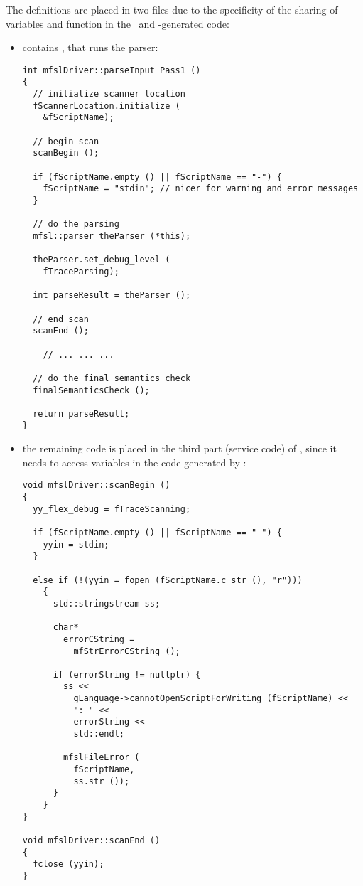 The definitions are placed in two files due to the specificity of the sharing of variables and function in the \flex\ and \bison-generated code: %
\begin{itemize}

\item {} contains , that runs the parser:
\begin{lstlisting}[language=CPlusPlus]
int mfslDriver::parseInput_Pass1 ()
{
  // initialize scanner location
  fScannerLocation.initialize (
    &fScriptName);

  // begin scan
  scanBegin ();

  if (fScriptName.empty () || fScriptName == "-") {
    fScriptName = "stdin"; // nicer for warning and error messages
  }

  // do the parsing
  mfsl::parser theParser (*this);

  theParser.set_debug_level (
    fTraceParsing);

  int parseResult = theParser ();

  // end scan
  scanEnd ();

	// ... ... ...

  // do the final semantics check
  finalSemanticsCheck ();

  return parseResult;
}
\end{lstlisting}

\item the remaining code is placed in the third part (service code) of , since it needs to access variables in the code generated by \flex:
\begin{lstlisting}[language=CPlusPlus]
void mfslDriver::scanBegin ()
{
  yy_flex_debug = fTraceScanning;

  if (fScriptName.empty () || fScriptName == "-") {
    yyin = stdin;
  }

  else if (!(yyin = fopen (fScriptName.c_str (), "r")))
    {
      std::stringstream ss;

      char*
        errorCString =
          mfStrErrorCString ();

      if (errorString != nullptr) {
        ss <<
          gLanguage->cannotOpenScriptForWriting (fScriptName) <<
          ": " <<
          errorString <<
          std::endl;

        mfslFileError (
          fScriptName,
          ss.str ());
      }
    }
}

void mfslDriver::scanEnd ()
{
  fclose (yyin);
}
\end{lstlisting}

\end{itemize}


